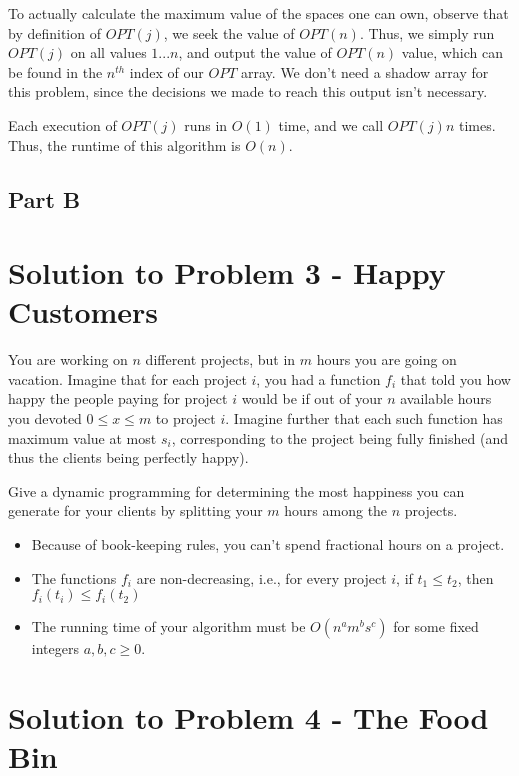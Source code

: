 \documentclass[11pt]{article}
\begin{document}
To actually calculate the maximum value of the spaces one can own, observe that by definition of $OPT(j)$, we seek the value of $OPT(n)$. Thus, we simply run $OPT(j)$ on all values $1 ... n$, and output the value of $OPT(n)$ value, which can be found in the $n^{th}$ index of our $OPT$ array. We don't need a shadow array for this problem, since the decisions we made to reach this output isn't necessary.

Each execution of $OPT(j)$ runs in $O(1)$ time, and we call $OPT(j) n$ times. Thus, the runtime of this algorithm is $O(n)$.

\subsection*{Part B}


\pagebreak

\section*{Solution to Problem 3 - Happy Customers}

You are working on $n$ different projects, but in $m$ hours you are going on vacation. Imagine that for each project $i$, you had a function $f_i$ that told you how happy the people paying for project $i$ would be if out of your $n$ available hours you devoted $0 \leq x \leq m$ to project $i$. Imagine further that each such function has maximum value at most $s_i$, corresponding to the project being fully finished (and thus the clients being perfectly happy).

Give a dynamic programming for determining the most happiness you can generate for your clients by splitting your $m$ hours among the $n$ projects.

\begin{itemize}
\item Because of book-keeping rules, you can't spend fractional hours on a project.
\item The functions $f_i$ are non-decreasing, i.e., for every project $i$, if $t_1 \leq t_2$, then $f_i(t_i) \leq f_i(t_2)$
\item The running time of your algorithm must be $O(n^am^bs^c)$ for some fixed integers $a, b, c \geq 0$.
\end{itemize}

\pagebreak

\section*{Solution to Problem 4 - The Food Bin}
\end{document}
